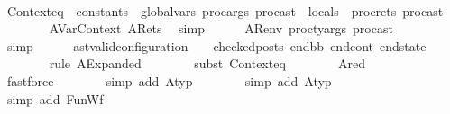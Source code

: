 \begin{isabellebody}
\ \ \ \ \isamarkupfalse%
\ Contexteq{\isacharcolon}{\kern0pt}{\isachardoublequoteopen}{\isasymLambda}\ {\isacharequal}{\kern0pt}\ {\isacharparenleft}{\kern0pt}constants\ {\isacharat}{\kern0pt}\ global{\isacharunderscore}{\kern0pt}vars{\isacharcomma}{\kern0pt}\ proc{\isacharunderscore}{\kern0pt}args\ proc{\isacharunderscore}{\kern0pt}ast\ {\isacharat}{\kern0pt}\ locals\ {\isacharat}{\kern0pt}\ proc{\isacharunderscore}{\kern0pt}rets\ proc{\isacharunderscore}{\kern0pt}ast{\isacharparenright}{\kern0pt}{\isachardoublequoteclose}\isanewline
\ \ \ \ \ \ \isamarkupfalse%
\ AVarContext\ ARets\ \isamarkupfalse%
\ simp\isanewline
\ \ \ \ \isamarkupfalse%
\ ARenv\ {\isacartoucheopen}proc{\isacharunderscore}{\kern0pt}ty{\isacharunderscore}{\kern0pt}args\ proc{\isacharunderscore}{\kern0pt}ast\ {\isacharequal}{\kern0pt}\ {}{\isacartoucheclose}\ \isamarkupfalse%
\ {\isachardoublequoteopen}{\isasymOmega}\ {\isacharequal}{\kern0pt}\ {\isacharbrackleft}{\kern0pt}{\isacharbrackright}{\kern0pt}{\isachardoublequoteclose}\ \isamarkupfalse%
\ simp\isanewline
\ \ \ \ \isamarkupfalse%
\ {\isachardoublequoteopen}ast{\isacharunderscore}{\kern0pt}valid{\isacharunderscore}{\kern0pt}configuration\ {\isasymLambda}\ {\isasymGamma}\ {\isacharbrackleft}{\kern0pt}{\isacharbrackright}{\kern0pt}\ checked{\isacharunderscore}{\kern0pt}posts\ end{\isacharunderscore}{\kern0pt}bb\ end{\isacharunderscore}{\kern0pt}cont\ end{\isacharunderscore}{\kern0pt}state{\isachardoublequoteclose}\isanewline
\ \ \ \ \ \ \isamarkupfalse%
\ {\isacharparenleft}{\kern0pt}rule\ AExpanded{\isacharparenright}{\kern0pt}\isanewline
\ \ \ \ \ \ \isamarkupfalse%
\ {\isacharparenleft}{\kern0pt}subst\ Contexteq{\isacharparenright}{\kern0pt}\isanewline
\ \ \ \ \ \ \isamarkupfalse%
\ Ared\ {\isacartoucheopen}{\isasymOmega}\ {\isacharequal}{\kern0pt}\ {\isacharbrackleft}{\kern0pt}{\isacharbrackright}{\kern0pt}{\isacartoucheclose}\ \isanewline
\ \ \ \ \ \ \isamarkupfalse%
\ fastforce\isanewline
\ \ \ \ \ \ \isamarkupfalse%
\ {\isacharparenleft}{\kern0pt}simp\ add{\isacharcolon}{\kern0pt}\ Atyp{\isacharparenright}{\kern0pt}\isanewline
\ \ \ \ \ \ \isamarkupfalse%
\ {\isacharparenleft}{\kern0pt}simp\ add{\isacharcolon}{\kern0pt}\ Atyp{\isacharparenright}{\kern0pt}\isanewline
\ \ \ \ \ \ \isamarkupfalse%
\ {\isacharparenleft}{\kern0pt}simp\ add{\isacharcolon}{\kern0pt}\ FunWf{\isacharparenright}{\kern0pt}\isanewline

\end{isabellebody}
